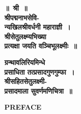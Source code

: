 \documentclass[11pt, openany]{book}
\begin{document}
\newpage
\hfill\break
\thispagestyle{empty}
\begin{center}
	\Large\textbf{॥~श्री~॥}\\
	\textbf{श्रीपद्मनाभसेवि-\\न्यखिलश्रीवर्धनी महाराज्ञी~। \\ श्रीसेतुलक्ष्म्यभिख्या \\ प्रत्यक्षा जयति वञ्चिभूलक्ष्मीः~॥}
	
	\vspace{.5cm}
	
	\textbf{ ग्रन्थावलिरियमिन्धे \\ प्रसाधिता तत्प्रसादगुणगुम्फा~।\\ श्रीसहितसेतुलक्ष्मी-\\ प्रसादमाला सुवर्णमणिचित्रा~॥}
\end{center}

\newpage
\thispagestyle{empty}

\begin{center}
\textbf{PREFACE}
\end{center}
\end{document}
